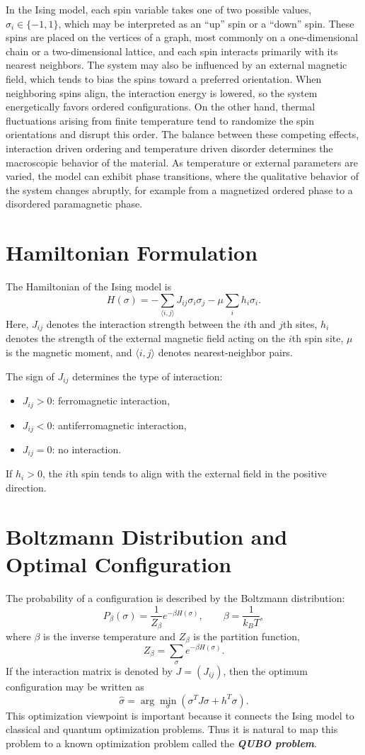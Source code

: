 \documentclass[english,12pt,a4paper]{report}
\begin{document}
In the Ising model, each spin variable takes one of two possible values, $\sigma_i\in\{-1,1\}$, which may be interpreted as an ``up'' spin or a ``down'' spin. These spins are placed on the vertices of a graph, most commonly on a one-dimensional chain or a two-dimensional lattice, and each spin interacts primarily with its nearest neighbors. The system may also be influenced by an external magnetic field, which tends to bias the spins toward a preferred orientation. When neighboring spins align, the interaction energy is lowered, so the system energetically favors ordered configurations. On the other hand, thermal fluctuations arising from finite temperature tend to randomize the spin orientations and disrupt this order. The balance between these competing effects, interaction driven ordering and temperature driven disorder determines the macroscopic behavior of the material. As temperature or external parameters are varied, the model can exhibit phase transitions, where the qualitative behavior of the system changes abruptly, for example from a magnetized ordered phase to a disordered paramagnetic phase.
	
\section{Hamiltonian Formulation}
The Hamiltonian of the Ising model is
\[
H(\sigma)=-\sum_{\langle i,j \rangle}J_{ij}\sigma_i\sigma_j-\mu \sum_i h_i\sigma_i.
\]
Here, $J_{ij}$ denotes the interaction strength between the $i$th and $j$th sites, $h_i$ denotes the strength of the external magnetic field acting on the $i$th spin site, $\mu$ is the magnetic moment, and $\langle i,j \rangle$ denotes nearest-neighbor pairs.

The sign of $J_{ij}$ determines the type of interaction:
\begin{itemize}
	\item $J_{ij}>0$: ferromagnetic interaction,
	\item $J_{ij}<0$: antiferromagnetic interaction,
	\item $J_{ij}=0$: no interaction.
\end{itemize}
If $h_i>0$, the $i$th spin tends to align with the external field in the positive direction.

\section{Boltzmann Distribution and Optimal Configuration}
The probability of a configuration is described by the Boltzmann distribution:
\[
P_\beta(\sigma)=\frac{1}{Z_\beta}e^{-\beta H(\sigma)}, \qquad \beta=\frac{1}{k_B T},
\]
where $\beta$ is the inverse temperature and $Z_\beta$ is the partition function,
\[
Z_\beta = \sum_{\sigma}e^{-\beta H(\sigma)}.
\]
If the interaction matrix is denoted by $J=(J_{ij})$, then the optimum configuration may be written as
\[
\hat{\sigma}=\arg\min_{\sigma}(\sigma^T J\sigma + h^T\sigma).
\]
This optimization viewpoint is important because it connects the Ising model to classical and quantum optimization problems. Thus it is natural to map this problem to a known optimization problem called the \emph{\textbf{QUBO problem}}.
	
\end{document}
